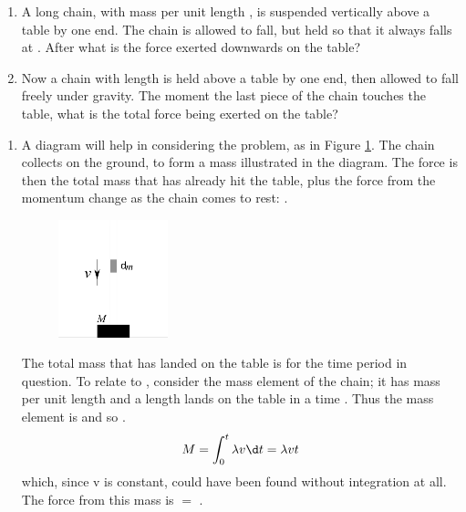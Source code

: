 
\begin{problem}[HE+_Chain] 
{\begin{enumerate}
\item A long chain, with mass per unit length , is suspended vertically above a table by one end. The chain is allowed to fall, but held so that it always falls at . After  what is the force exerted downwards on the table?
\item Now a chain with length  is held above a table by one end, then allowed to fall freely under gravity. The moment the last piece of the chain touches the table, what is the total force being exerted on the table?
\end{enumerate}
}
{}
{\begin{enumerate}
	\item A diagram will help in considering the problem, as in Figure \ref{fig:Dynamics_falling_chain_force}. The chain collects on the ground, to form a mass  illustrated in the diagram. The force is then the total mass that has already hit the table, plus the force from the momentum change as the chain comes to rest: .

\begin{figure}[h]
	\centering
	\includegraphics[width=0.3\textwidth]{../../../figures/Dynamics_falling_chain_force.svg}
	\caption{}
	\label{fig:Dynamics_falling_chain_force}
\end{figure}

The total mass that has landed on the table is  for the time period in question. To relate  to , consider the mass element of the chain; it has mass per unit length \vari{\lambda} and a length  lands on the table in a time . Thus the mass element is  and so .
\begin{equation*} 
M = \int_{0}^{t}\lambda v \d t = \lambda v t
\end{equation*}
which, since v is constant, could have been found without integration at all. The force from this mass is  $=$ .


\end{enumerate}}
\end{problem}
